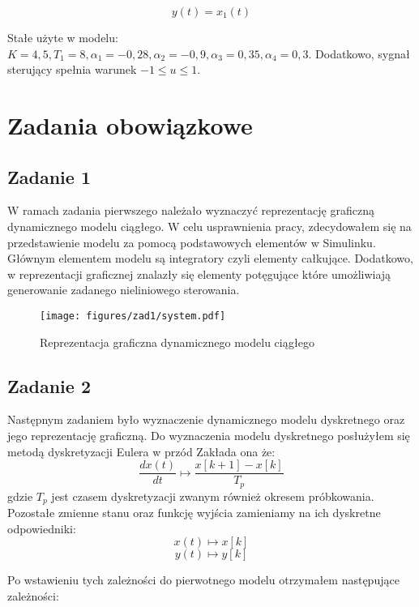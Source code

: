 \documentclass[a4paper,titlepage,11pt,floatssmall]{mwrep}
\begin{document}
\begin{equation*}
y(t) = x_1(t)
\end{equation*}

Stałe użyte w modelu: $K = 4,5, T_1 = 8, \alpha_1 = -0,28, \alpha_2 = -0,9, \alpha_3 = 0,35, \alpha_4 = 0,3$. Dodatkowo, sygnał sterujący spełnia warunek $ -1 \leqslant u \leqslant 1$.


\chapter{Zadania obowiązkowe}

\section{Zadanie 1}
W ramach zadania pierwszego należało wyznaczyć reprezentację graficzną dynamicznego modelu ciągłego. W celu usprawnienia pracy, zdecydowałem się na przedstawienie modelu za pomocą podstawowych elementów w Simulinku. Głównym elementem modelu są integratory czyli elementy całkujące. Dodatkowo, w reprezentacji graficznej znalazły się elementy potęgujące które umożliwiają generowanie zadanego nieliniowego sterowania.

\begin{figure}[H]
\texttt{[image: figures/zad1/system.pdf]}
\caption{Reprezentacja graficzna dynamicznego modelu ciągłego }
\end{figure}

\newpage
\section{Zadanie 2}
Następnym zadaniem było wyznaczenie dynamicznego modelu dyskretnego oraz jego reprezentację graficzną. Do wyznaczenia modelu dyskretnego posłużyłem się metodą dyskretyzacji Eulera w przód Zakłada ona że:
\begin{equation*}
\frac{dx(t)}{dt} \mapsto \frac{x[k+1] - x[k]}{T_p}
\end{equation*}
gdzie $T_p$ jest czasem dyskretyzacji zwanym również okresem próbkowania.
Pozostałe zmienne stanu oraz funkcję wyjścia zamieniamy na ich dyskretne odpowiedniki:
\begin{equation*}
x(t) \mapsto x[k] 
\end{equation*}
\begin{equation*}
y(t) \mapsto y[k]
\end{equation*}

Po wstawieniu tych zależności do pierwotnego modelu otrzymałem następujące zależności:
\end{document}
